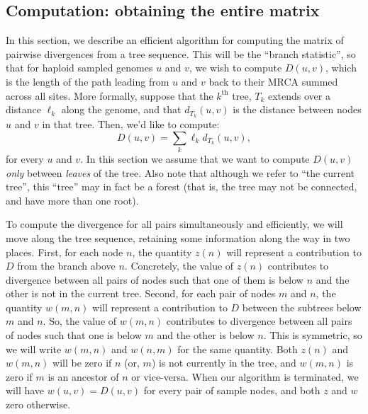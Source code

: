 



\subsection*{Computation: obtaining the entire matrix}

In this section, we describe an efficient algorithm
for computing the matrix of pairwise divergences from a tree sequence.
%
This will be the ``branch statistic'', so that for haploid sampled genomes
$u$ and $v$, we wish to compute $D(u, v)$, which is the length of the path
leading from $u$ and $v$ back to their MRCA summed across all sites.
%
More formally, suppose that the $k^\text{th}$ tree, $T_k$
extends over a distance $\ell_k$ along the genome,
and that $d_{T_k}(u, v)$ is the distance between nodes $u$ and $v$ in that tree.
%
Then, we'd like to compute:
%
$$ D(u, v) = \sum_k \ell_k d_{T_k}(u, v), $$
%
for every $u$ and $v$.
%
In this section we assume that we want to compute $D(u, v)$ \emph{only}
between \emph{leaves} of the tree.
%
Also note that although we refer to ``the current tree'',
this ``tree'' may in fact be a forest
(that is, the tree may not be connected, and have more than one root).

To compute the divergence for all pairs simultaneously and efficiently,
we will move along the tree sequence,
retaining some information along the way in two places.
%
First, for each node $n$,
the quantity $z(n)$ will represent a contribution to $D$ from the branch above $n$.
%
Concretely, the value of $z(n)$ contributes to divergence
between all pairs of nodes such that one of them is below $n$ and the other is not
in the current tree.
%
Second, for each pair of nodes $m$ and $n$,
the quantity $w(m, n)$ will represent a contribution to $D$ between the subtrees below $m$ and $n$.
%
So, the value of $w(m, n)$ contributes to divergence
between all pairs of nodes such that one is below $m$ and the other is below $n$.
%
This is symmetric, so we will write $w(m, n)$ and $w(n, m)$ for the same quantity.
%
Both $z(n)$ and $w(m, n)$ will be zero if $n$ (or, $m$) is not currently in the tree,
and $w(m, n)$ is zero if $m$ is an ancestor of $n$ or vice-versa.
%
When our algorithm is terminated, we will have $w(u, v) = D(u, v)$ for every pair of sample nodes,
and both $z$ and $w$ zero otherwise.

